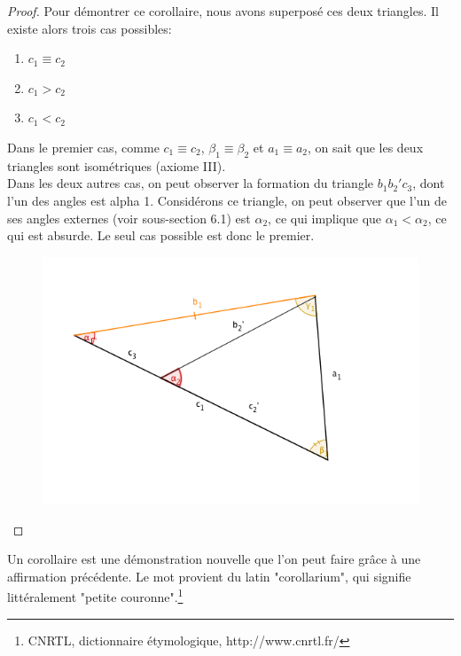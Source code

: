 \documentclass[a4paper,12pt]{article}
\begin{document}
\begin{proof}
Pour démontrer ce corollaire, nous avons superposé ces deux triangles. Il existe alors trois cas possibles:
\begin{enumerate}
    \item $c_1 \equiv c_2$
    \item $c_1 > c_2$
    \item $c_1 < c_2$
\end{enumerate}
Dans le premier cas, comme $c_1 \equiv c_2$, $\beta_1 \equiv \beta_2$ et $a_1 \equiv a_2$, on sait que les deux triangles sont isométriques (axiome III).\\
Dans les deux autres cas, on peut observer la formation du triangle $b_1b_2'c_3$, dont l'un des angles est alpha 1. Considérons ce triangle, on peut observer que l'un de ses angles externes (voir sous-section 6.1) est $\alpha_2$, ce qui implique que $\alpha_1 < \alpha_2$, ce qui est absurde. Le seul cas possible est donc le premier.
\begin{figure}[H]
    \centering
    \includegraphics[scale=0.6]{theorems/corIsom2/corIsom2_2.png}
\end{figure}
\end{proof}

\begin{remark}
Un corollaire est une démonstration nouvelle que l'on peut faire grâce à une affirmation précédente. Le mot provient du latin "corollarium", qui signifie littéralement "petite couronne".\footnote{CNRTL, dictionnaire étymologique, http://www.cnrtl.fr/}
\end{remark}
\end{document}
